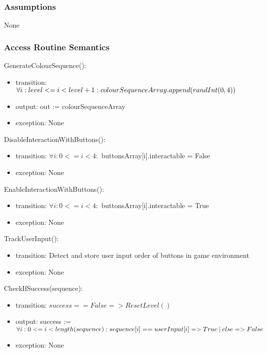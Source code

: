 \documentclass[12pt, titlepage]{article}
\begin{document}
\subsubsection{Assumptions}

None

\subsubsection{Access Routine Semantics}

\noindent GenerateColourSequence():
\begin{itemize}
\item transition: $ \forall i: level <= i < level + 1 : \newline colourSequenceArray.append(randInt(0,4))$
\item output: out := colourSequenceArray
\item exception: None
\end{itemize}

\noindent DisableInteractionWithButtons():
\begin{itemize}
\item transition: $ \forall i: 0 <= i < 4 :$ \newline buttonsArray[i].interactable = False
\item exception: None
\end{itemize}

\noindent EnableInteractionWithButtons():
\begin{itemize}
\item transition: $ \forall i: 0 <= i < 4 :$ \newline buttonsArray[i].interactable = True
\item exception: None
\end{itemize}

\noindent TrackUserInput():
\begin{itemize}
\item transition: Detect and store user input order of buttons in game environment
\item exception: None
\end{itemize}

\noindent CheckIfSuccess(sequence):
\begin{itemize}
\item transition: $success == False => ResetLevel()$
\item output: success := $ \forall i: 0 <= i < length(sequence) : \newline sequence[i] == userInput[i] => True  \: | \: else => False$
\item exception: None
\end{itemize}
\end{document}
